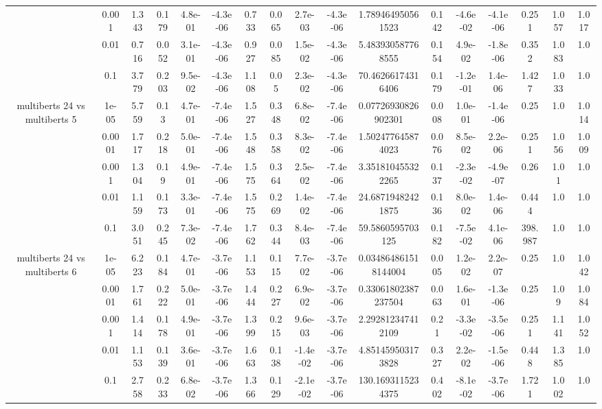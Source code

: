 \begin{tabular}{|c|c|c|c|c|c|c|c|c|c|c|c|c|c|c|c|c|}
 & 0.001 & 1.343 & 0.179 & 4.8e-01 & -4.3e-06 & 0.733 & 0.065 & 2.7e-03 & -4.3e-06 & 1.789464950561523 & 0.142 & -4.6e-02 & -4.1e-06 & 0.251 & 1.057 & 1.017 \\
 & 0.01 & 0.716 & 0.052 & 3.1e-01 & -4.3e-06 & 0.927 & 0.085 & 1.5e-02 & -4.3e-06 & 5.483930587768555 & 0.154 & 4.9e-02 & -1.8e-06 & 0.352 & 1.083 & 1.0 \\
 & 0.1 & 3.779 & 0.203 & 9.5e-02 & -4.3e-06 & 1.108 & 0.05 & 2.3e-02 & -4.3e-06 & 70.46266174316406 & 0.179 & -1.2e-01 & 1.4e-06 & 1.427 & 1.033 & 1.0 \\
\hline
\multirow{5}{*}{multiberts 24 vs multiberts 5} & 1e-05 & 5.759 & 0.13 & 4.7e-01 & -7.4e-06 & 1.527 & 0.348 & 6.8e-02 & -7.4e-06 & 0.07726930826902301 & 0.008 & 1.0e-01 & -1.4e-06 & 0.25 & 1.0 & 1.014 \\
 & 0.0001 & 1.717 & 0.218 & 5.0e-01 & -7.4e-06 & 1.548 & 0.358 & 8.3e-02 & -7.4e-06 & 1.502477645874023 & 0.076 & 8.5e-02 & 2.2e-06 & 0.251 & 1.056 & 1.009 \\
 & 0.001 & 1.304 & 0.19 & 4.9e-01 & -7.4e-06 & 1.575 & 0.364 & 2.5e-02 & -7.4e-06 & 3.351810455322265 & 0.137 & -2.3e-02 & -4.9e-07 & 0.26 & 1.01 & 1.0 \\
 & 0.01 & 1.159 & 0.173 & 3.3e-01 & -7.4e-06 & 1.575 & 0.269 & 1.4e-02 & -7.4e-06 & 24.68719482421875 & 0.136 & 8.0e-02 & 1.4e-06 & 0.444 & 1.0 & 1.0 \\
 & 0.1 & 3.051 & 0.245 & 7.3e-02 & -7.4e-06 & 1.762 & 0.344 & 8.4e-03 & -7.4e-06 & 59.5860595703125 & 0.182 & -7.5e-02 & 4.1e-06 & 398.987 & 1.0 & 1.0 \\
\hline
\multirow{5}{*}{multiberts 24 vs multiberts 6} & 1e-05 & 6.223 & 0.184 & 4.7e-01 & -3.7e-06 & 1.153 & 0.115 & 7.7e-02 & -3.7e-06 & 0.034864861518144004 & 0.005 & 1.2e-02 & 2.2e-07 & 0.25 & 1.0 & 1.042 \\
 & 0.0001 & 1.761 & 0.222 & 5.0e-01 & -3.7e-06 & 1.444 & 0.227 & 6.9e-02 & -3.7e-06 & 0.33061802387237504 & 0.063 & 1.6e-01 & -1.3e-06 & 0.25 & 1.09 & 1.084 \\
 & 0.001 & 1.414 & 0.178 & 4.9e-01 & -3.7e-06 & 1.399 & 0.215 & 9.6e-03 & -3.7e-06 & 2.292812347412109 & 0.21 & -3.3e-02 & -3.5e-06 & 0.251 & 1.141 & 1.052 \\
 & 0.01 & 1.153 & 0.139 & 3.6e-01 & -3.7e-06 & 1.663 & 0.138 & -1.4e-02 & -3.7e-06 & 4.851459503173828 & 0.327 & 2.2e-02 & -1.5e-06 & 0.448 & 1.385 & 1.0 \\
 & 0.1 & 2.758 & 0.233 & 6.8e-02 & -3.7e-06 & 1.366 & 0.129 & -2.1e-02 & -3.7e-06 & 130.1693115234375 & 0.402 & -8.1e-02 & -3.7e-06 & 1.721 & 1.002 & 1.0 \\

\end{tabular}
